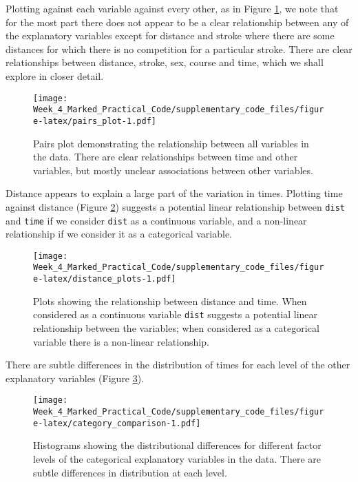 \documentclass[a4paper,11pt]{article}
\begin{document}
Plotting against each variable against every other, as in Figure \ref{pairs_plot}, we note that for the most part there does not appear to be a clear relationship between any of the explanatory variables except for distance and stroke where there are some distances for which there is no competition for a particular stroke. There are clear relationships between distance, stroke, sex, course and time, which we shall explore in closer detail.

\begin{figure}
  \centering
  \texttt{[image: Week\_4\_Marked\_Practical\_Code/supplementary\_code\_files/figure-latex/pairs\_plot-1.pdf]}
  \caption{Pairs plot demonstrating the relationship between all variables in the data. There are clear relationships between time and other variables, but mostly unclear associations between other variables.}
  \label{pairs_plot}
\end{figure}

Distance appears to explain a large part of the variation in times. Plotting time against distance (Figure \ref{distance_time}) suggests a potential linear relationship between \verb|dist| and \verb|time| if we consider \verb|dist| as a continuous variable, and a non-linear relationship if we consider it as a categorical variable.

\begin{figure}
  \texttt{[image: Week\_4\_Marked\_Practical\_Code/supplementary\_code\_files/figure-latex/distance\_plots-1.pdf]}

  \caption{Plots showing the relationship between distance and time. When considered as a continuous variable \texttt{dist} suggests a potential linear relationship between the variables; when considered as a categorical variable there is a non-linear relationship.}
  \label{distance_time}
\end{figure}

There are subtle differences in the distribution of times for each level of the other explanatory variables (Figure \ref{category_comparison}).

\begin{figure}
  \centering
  \texttt{[image: Week\_4\_Marked\_Practical\_Code/supplementary\_code\_files/figure-latex/category\_comparison-1.pdf]}

  \caption{Histograms showing the distributional differences for different factor levels of the categorical explanatory variables in the data. There are subtle differences in distribution at each level.}
  \label{category_comparison}
\end{figure}
\end{document}
